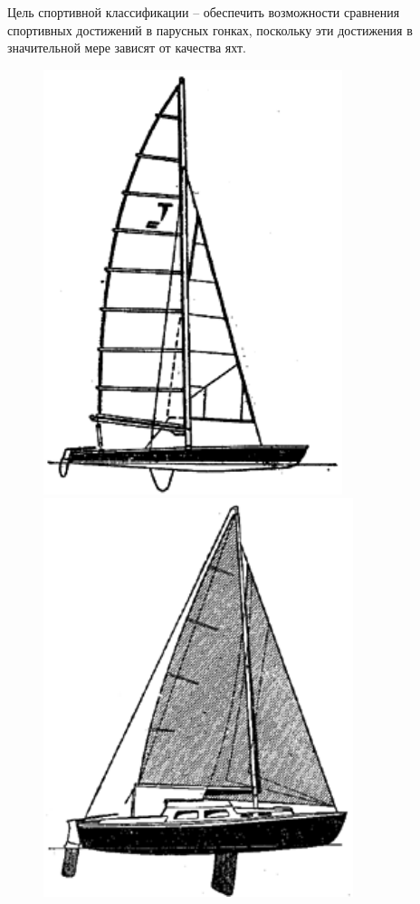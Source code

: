 \documentclass[a4paper, 12pt, twoside, final]{scrbook}
\begin{document}
Цель спортивной классификации \--- обеспечить возможности сравнения спортивных
достижений в парусных гонках, поскольку эти достижения в значительной
мере зависят от качества яхт.

\begin{figure}[htbp]
	\hfill{}\includegraphics[scale=0.7]{Katamaran-monotip_Tornado}%
	\hfill{}\includegraphics[scale=0.7]{Krejsersko-gonochnyj_shvertbot_svobodnogo_klassa_t3}%

\end{figure}
\end{document}
